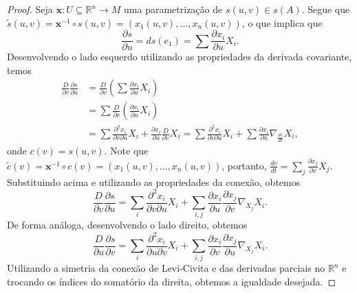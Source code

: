 \begin{lemma}[Simetria]
\begin{proof}
        Seja $\mathbf{x}:U\subseteq \mathbb{R}^{n}\to M$ uma parametrização de $s(u,v) \in s(A)$. Segue que
        $\tilde{s}(u,v)=\mathbf{x}^{-1}\circ s(u,v)=(x_{1}(u,v), \dots, x_{n}(u,v))$, o que implica que
        \begin{equation*}
            \frac{\partial s}{\partial u}=ds(e_{1})=\sum\frac{\partial x_{i}}{\partial u}X_{i}.
        \end{equation*}
        Desenvolvendo o lado esquerdo utilizando as propriedades da derivada covariante, temos
        \begin{align*}
            \frac{D}{\partial v}\frac{\partial s}{\partial u} & =\frac{D}{\partial v}\left( \sum\frac{\partial x_{i}}{\partial u}X_{i} \right)                                                                                                                                                                       \\
                                                              & = \sum\frac{D}{\partial v}\left( \frac{\partial x_{i}}{\partial u}X_{i} \right)                                                                                                                                                                      \\
                                                              & = \sum\frac{\partial^{2}x_{i}}{\partial v\partial u}X_{i} + \frac{\partial x_{i}}{\partial u}\frac{D}{\partial v}X_{i} = \sum\frac{\partial^{2}x_{i}}{\partial v\partial u}X_{i} + \sum\frac{\partial x_{i}}{\partial u}\nabla_{\frac{dc}{dt}}X_{i},
        \end{align*}
        onde $c(v)=s(u,v)$.
        Note que $\tilde{c}(v)=\mathbf{x}^{-1} \circ c(v)=(x_{1}(u,v), \dots, x_{n}(u,v))$, portanto, $\frac{dc}{dt}=\sum_{j}\frac{\partial x_{j}}{\partial v}X_{j}$.
        Substituindo acima e utilizando as propriedades da conexão, obtemos
        \begin{equation*}
            \frac{D}{\partial v}\frac{\partial s}{\partial u}=\sum_{i}\frac{\partial^{2} x_{i}}{\partial v\partial u}X_{i}+ \sum_{i,j}\frac{\partial x_{i}}{\partial u}\frac{\partial x_{j}}{\partial v}\nabla_{X_{j}}X_{i}.
        \end{equation*}
        De forma análoga, desenvolvendo o lado direito, obtemos
        \begin{equation*}
            \frac{D}{\partial u}\frac{\partial s}{\partial v}=\sum_{i}\frac{\partial^{2}x_{i}}{\partial u\partial v}X_{i}+\sum_{i,j}\frac{\partial x_{i}}{\partial v}\frac{\partial x_{j}}{\partial u}\nabla_{X_{j}}X_{i}.
        \end{equation*}
        Utilizando a simetria da conexão de Levi-Civita e das derivadas parciais no $\mathbb{R}^{n}$ e trocando os índices do somatório da direita, obtemos a igualdade desejada.
    \end{proof}
\end{lemma}
